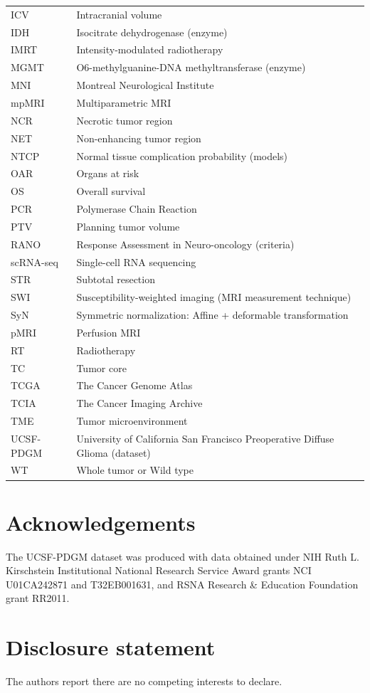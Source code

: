 \documentclass[a4paper,11pt,leqno]{article}
\begin{document}
\begin{tabular}{@{}ll}
ICV & Intracranial volume \\
IDH & Isocitrate dehydrogenase (enzyme)\\
IMRT &  Intensity-modulated radiotherapy \\
MGMT & O6-methylguanine-DNA methyltransferase (enzyme) \\
MNI & Montreal Neurological Institute \\
mpMRI & Multiparametric MRI \\
NCR & Necrotic tumor region \\
NET & Non-enhancing tumor region \\
NTCP & Normal tissue complication probability (models) \\
OAR & Organs at risk \\
OS & Overall survival \\
PCR & Polymerase Chain Reaction \\
PTV & Planning tumor volume \\
RANO & Response Assessment in Neuro-oncology (criteria) \\
scRNA-seq &  Single-cell RNA sequencing \\
STR & Subtotal resection \\
SWI & Susceptibility-weighted imaging (MRI measurement technique) \\
SyN & Symmetric normalization: Affine + deformable transformation \\
pMRI & Perfusion MRI \\
RT  & Radiotherapy \\
TC & Tumor core \\
TCGA & The Cancer Genome Atlas \\
TCIA & The Cancer Imaging Archive \\
TME & Tumor microenvironment\\
UCSF-PDGM & University of California San Francisco Preoperative Diffuse Glioma (dataset)\\
WT & Whole tumor or Wild type
\end{tabular}

\section*{Acknowledgements}
The UCSF-PDGM dataset was produced with data obtained under NIH Ruth L. Kirschstein Institutional National Research Service Award grants NCI U01CA242871 and T32EB001631, and RSNA Research \& Education Foundation grant RR2011.

\section*{Disclosure statement}
The authors report there are no competing interests to declare.
\end{document}
